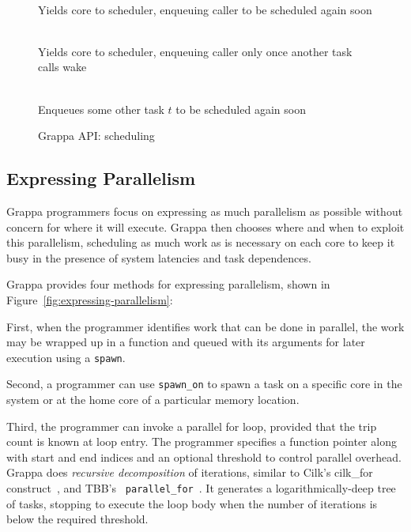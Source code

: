 \begin{figure}[htbp]
  \begin{center}
    \begin{description}\small
    \item[ \texttt{ yield() } ] \hfill \\
      Yields core to scheduler, enqueuing caller to be scheduled again soon
    \item[ \texttt{ suspend() } ] \hfill \\
      Yields core to scheduler, enqueuing caller only once another task calls wake
    \item[ \texttt{ wake( task * $t$ ) } ] \hfill \\
      Enqueues some other task $t$ to be scheduled again soon
    \end{description}
    \begin{minipage}{0.95\columnwidth}
      \caption{\label{fig:scheduling} Grappa API: scheduling } %
    \end{minipage}
  \end{center}
\end{figure}


\subsection{Expressing Parallelism}

Grappa programmers focus on expressing as much
parallelism as possible without concern for where it will execute.
Grappa then chooses where and when to exploit this parallelism,
scheduling as much work as is necessary on each core to keep it busy
in the presence of system latencies and task dependences.

Grappa provides four methods for expressing parallelism, shown in
Figure~\ref{fig:expressing-parallelism}:

First, when the programmer identifies work
that can be done in parallel, the work may be wrapped up in a function
and queued with its arguments for later execution using a
\texttt{spawn}.

Second, a programmer can use \texttt{spawn\_on} to spawn a task on a
specific core in the system or at the home core of a particular memory
location.

Third, the programmer can invoke a parallel for loop, provided that the trip
count is known at loop entry. The programmer specifies a function pointer
along with start and end indices and an optional threshold to control parallel
overhead. Grappa does {\em recursive decomposition} of iterations, similar to
Cilk's cilk\_for construct~\cite {cilkforimplementation}, and TBB's {\tt
parallel\_for}~\cite{intel_tbb}. It generates a logarithmically-deep tree of
tasks, stopping to execute the loop body when the number of iterations is
below the required threshold.

